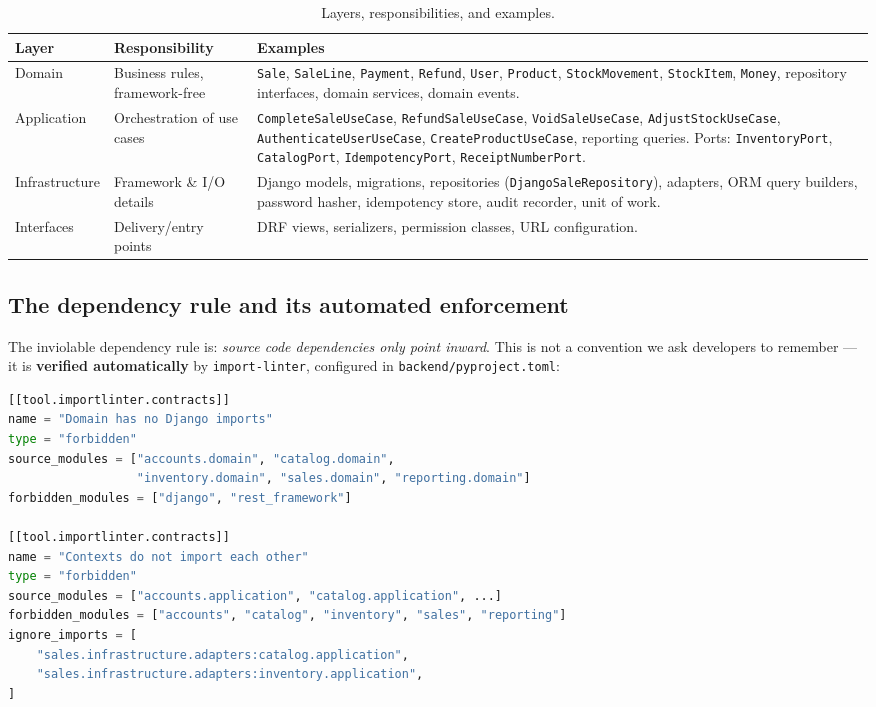 \documentclass[11pt,a4paper]{article}
\begin{document}
\begin{table}[htbp]\centering
\small
\caption{Layers, responsibilities, and examples.}
\begin{tabular}{@{}p{}p{}p{}@{}}
\toprule
\textbf{Layer} & \textbf{Responsibility} & \textbf{Examples} \\
\midrule
Domain & Business rules, framework-free & \texttt{Sale}, \texttt{SaleLine}, \texttt{Payment}, \texttt{Refund},
\texttt{User}, \texttt{Product}, \texttt{StockMovement}, \texttt{StockItem}, \texttt{Money},
repository interfaces, domain services, domain events. \\
Application & Orchestration of use cases & \texttt{CompleteSaleUseCase}, \texttt{RefundSaleUseCase},
\texttt{VoidSaleUseCase}, \texttt{AdjustStockUseCase}, \texttt{AuthenticateUserUseCase},
\texttt{CreateProductUseCase}, reporting queries. Ports: \texttt{InventoryPort}, \texttt{CatalogPort},
\texttt{IdempotencyPort}, \texttt{ReceiptNumberPort}. \\
Infrastructure & Framework \& I/O details & Django models, migrations, repositories
(\texttt{DjangoSaleRepository}), adapters, ORM query builders, password hasher, idempotency store,
audit recorder, unit of work. \\
Interfaces & Delivery/entry points & DRF views, serializers, permission classes, URL configuration. \\
\bottomrule
\end{tabular}
\end{table}

\subsection{The dependency rule and its automated enforcement}

The inviolable dependency rule is: \emph{source code dependencies only point inward}. This is not a
convention we ask developers to remember --- it is \textbf{verified automatically} by
\texttt{import-linter}, configured in \texttt{backend/pyproject.toml}:

\begin{lstlisting}[language=Python,caption={Architecture contracts enforced by import-linter (excerpt).}]
[[tool.importlinter.contracts]]
name = "Domain has no Django imports"
type = "forbidden"
source_modules = ["accounts.domain", "catalog.domain",
                  "inventory.domain", "sales.domain", "reporting.domain"]
forbidden_modules = ["django", "rest_framework"]

[[tool.importlinter.contracts]]
name = "Contexts do not import each other"
type = "forbidden"
source_modules = ["accounts.application", "catalog.application", ...]
forbidden_modules = ["accounts", "catalog", "inventory", "sales", "reporting"]
ignore_imports = [
    "sales.infrastructure.adapters:catalog.application",
    "sales.infrastructure.adapters:inventory.application",
]
\end{lstlisting}
\end{document}

